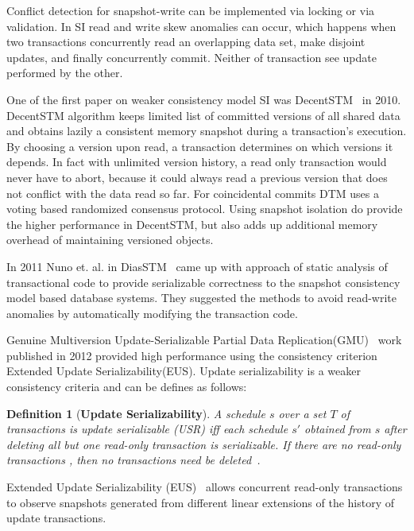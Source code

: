 \documentclass[12pt,english]{report}
\newtheorem{definition}{Definition}[section]
\begin{document}
Conflict detection for snapshot-write can be implemented via locking or via validation. In SI read and write skew anomalies can occur, which happens when two transactions concurrently read an overlapping data set, make disjoint updates, and finally concurrently commit. Neither of transaction see update performed by the other.

One of the first paper on weaker consistency model SI was DecentSTM~\cite{DecentSTM:5470446} in 2010.  DecentSTM algorithm keeps limited list of committed versions of all shared data and obtains lazily a consistent memory snapshot during a transaction’s execution. By choosing a version upon read, a transaction determines on which versions it depends. In fact with unlimited version history, a read only transaction would never have to abort, because it could always read a previous version that does not conflict with the data read so far. For coincidental commits DTM uses a voting based randomized consensus protocol. Using snapshot isolation do provide the higher performance in DecentSTM, but also adds up additional memory overhead of maintaining versioned objects.  

In 2011 Nuno et. al. in DiasSTM~\cite{dias2011efficient} came up with approach of static analysis of transactional code to provide serializable correctness to the snapshot consistency model based database systems. They suggested the methods to avoid read-write anomalies by automatically modifying the transaction code.

Genuine Multiversion Update-Serializable Partial Data Replication(GMU)~\cite{GMU:peluso2012scalability} work published in 2012 provided high performance using the consistency criterion Extended Update Serializability(EUS). Update serializability is a weaker consistency criteria and can be defines as follows:

\begin{definition}[\textbf{Update Serializability}]
A schedule $s$ over a set $T$ of transactions is update serializable (USR) iff each schedule $s'$ obtained from $s$ after deleting all but one read-only transaction is serializable. If there are no read-only transactions , then no transactions need be deleted~\cite{UpdateSerializability1986}.
\end{definition}

Extended Update Serializability (EUS)~\cite{EUS:HansdahPatnaik} allows concurrent read-only transactions to observe snapshots generated from different linear extensions of the history of update transactions.
\end{document}
